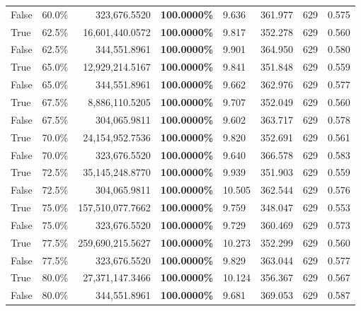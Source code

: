 \begin{table}[H]
\begin{tabular}{|m{}| m{}| r | R{0.13\textwidth}| R{0.09\textwidth}| R{0.09\textwidth}| R{0.09\textwidth}| R{0.11\textwidth}}
False & 60.0\% & 323,676.5520 & \bfseries \color{red} 100.0000\% & 9.636 & 361.977 & 629 & 0.575 \\
True & 62.5\% & 16,601,440.0572 & \bfseries \color{red} 100.0000\% & 9.817 & 352.278 & 629 & 0.560 \\
False & 62.5\% & 344,551.8961 & \bfseries \color{red} 100.0000\% & 9.901 & 364.950 & 629 & 0.580 \\
True & 65.0\% & 12,929,214.5167 & \bfseries \color{red} 100.0000\% & 9.841 & 351.848 & 629 & 0.559 \\
False & 65.0\% & 344,551.8961 & \bfseries \color{red} 100.0000\% & 9.662 & 362.976 & 629 & 0.577 \\
True & 67.5\% & 8,886,110.5205 & \bfseries \color{red} 100.0000\% & 9.707 & 352.049 & 629 & 0.560 \\
False & 67.5\% & \color{red} 304,065.9811 & \bfseries \color{red} 100.0000\% & 9.602 & 363.717 & 629 & 0.578 \\
True & 70.0\% & 24,154,952.7536 & \bfseries \color{red} 100.0000\% & 9.820 & 352.691 & 629 & 0.561 \\
False & 70.0\% & 323,676.5520 & \bfseries \color{red} 100.0000\% & 9.640 & 366.578 & 629 & 0.583 \\
True & 72.5\% & 35,145,248.8770 & \bfseries \color{red} 100.0000\% & 9.939 & 351.903 & 629 & 0.559 \\
False & 72.5\% & \color{red} 304,065.9811 & \bfseries \color{red} 100.0000\% & 10.505 & 362.544 & 629 & 0.576 \\
True & 75.0\% & 157,510,077.7662 & \bfseries \color{red} 100.0000\% & 9.759 & 348.047 & 629 & 0.553 \\
False & 75.0\% & 323,676.5520 & \bfseries \color{red} 100.0000\% & 9.729 & 360.469 & 629 & 0.573 \\
True & 77.5\% & 259,690,215.5627 & \bfseries \color{red} 100.0000\% & 10.273 & 352.299 & 629 & 0.560 \\
False & 77.5\% & 323,676.5520 & \bfseries \color{red} 100.0000\% & 9.829 & 363.044 & 629 & 0.577 \\
True & 80.0\% & 27,371,147.3466 & \bfseries \color{red} 100.0000\% & 10.124 & 356.367 & 629 & 0.567 \\
False & 80.0\% & 344,551.8961 & \bfseries \color{red} 100.0000\% & 9.681 & 369.053 & 629 & 0.587 \\

\end{tabular}
\end{table}
